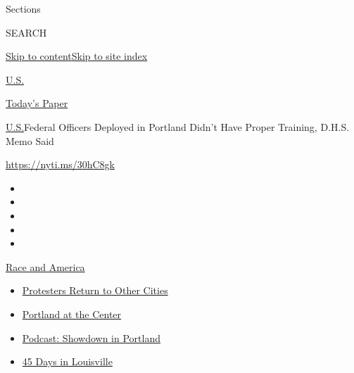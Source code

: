 Sections

SEARCH

\protect\hyperlink{site-content}{Skip to
content}\protect\hyperlink{site-index}{Skip to site index}

\href{https://www.nytimes.com/section/us}{U.S.}

\href{https://myaccount.nytimes.com/auth/login?response_type=cookie\&client_id=vi}{}

\href{https://www.nytimes.com/section/todayspaper}{Today's Paper}

\href{/section/us}{U.S.}\textbar{}Federal Officers Deployed in Portland
Didn't Have Proper Training, D.H.S. Memo Said

\url{https://nyti.ms/30hC8gk}

\begin{itemize}
\item
\item
\item
\item
\item
\end{itemize}

\href{https://www.nytimes.com/news-event/george-floyd-protests-minneapolis-new-york-los-angeles?action=click\&pgtype=Article\&state=default\&region=TOP_BANNER\&context=storylines_menu}{Race
and America}

\begin{itemize}
\tightlist
\item
  \href{https://www.nytimes.com/2020/07/26/us/protests-portland-seattle-trump.html?action=click\&pgtype=Article\&state=default\&region=TOP_BANNER\&context=storylines_menu}{Protesters
  Return to Other Cities}
\item
  \href{https://www.nytimes.com/2020/07/24/us/portland-oregon-protests-white-race.html?action=click\&pgtype=Article\&state=default\&region=TOP_BANNER\&context=storylines_menu}{Portland
  at the Center}
\item
  \href{https://www.nytimes.com/2020/07/23/podcasts/the-daily/portland-protests.html?action=click\&pgtype=Article\&state=default\&region=TOP_BANNER\&context=storylines_menu}{Podcast:
  Showdown in Portland}
\item
  \href{https://www.nytimes.com/interactive/2020/07/16/us/black-lives-matter-protests-louisville-breonna-taylor.html?action=click\&pgtype=Article\&state=default\&region=TOP_BANNER\&context=storylines_menu}{45
  Days in Louisville}
\end{itemize}


